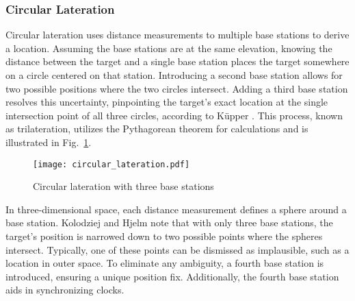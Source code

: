 \subsubsection{Circular Lateration}
Circular lateration uses distance measurements to multiple base stations to derive a location. Assuming the base stations are at the same elevation, knowing the distance between the target and a single base station places the target somewhere on a circle centered on that station. Introducing a second base station allows for two possible positions where the two circles intersect. Adding a third base station resolves this uncertainty, pinpointing the target's exact location at the single intersection point of all three circles, according to K\"upper \cite{kupper2005location}. This process, known as trilateration, utilizes the Pythagorean theorem for calculations and is illustrated in Fig.~\ref{fig:circular_lateration}.

\begin{figure}[htbp]
    \centering
    \texttt{[image: circular\_lateration.pdf]}
    \caption{Circular lateration with three base stations \cite{kupper2005location}}
    \label{fig:circular_lateration}
\end{figure}

In three-dimensional space, each distance measurement defines a sphere around a base station. 
Kolodziej and Hjelm \cite{kolodziej2017local} note that with only three base stations, the target's position is narrowed down to two possible points where the spheres intersect. 
Typically, one of these points can be dismissed as implausible, such as a location in outer space. 
To eliminate any ambiguity, a fourth base station is introduced, ensuring a unique position fix. Additionally, the fourth base station aids in synchronizing clocks.

